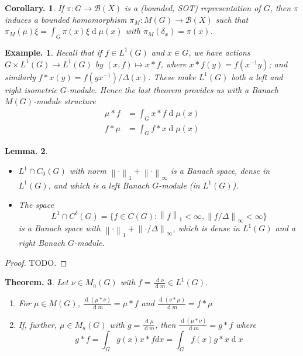 \documentclass[11pt, a4paper]{memoir}
\newcommand{\norm}[1]{\ensuremath{\left\lVert#1\right\rVert}}
\theoremstyle{change}
\newtheorem{theorem}{Theorem.}[section]
\newtheorem{lemma}[theorem]{Lemma.}
\newtheorem{corollary}[theorem]{Corollary.}
\theoremstyle{plain}
\theoremstyle{nonumberplain}
\newtheorem{example}{Example.}
\newtheorem{proof}{Proof}
\renewcommand{\d}[1]{\ensuremath{\operatorname{d}\!{#1}}}
\numberwithin{equation}{section}
\begin{document}
\begin{corollary}
    If $\pi:G\to\mathcal{B}(X)$ is a (bounded, SOT) representation of $G$, then $\pi$ induces a bounded homomorphism $\pi_M:M(G)\to\mathcal{B}(X)$ such that $\pi_M(\mu)\xi=\int_G\pi(x)\xi\d{\mu(x)}$ with $\pi_M(\delta_x)=\pi(x)$.
\end{corollary}
\begin{example}
    Recall that if $f\in L^1(G)$ and $x\in G$, we have actions $G\times L^1(G)\to L^1(G)$ by $(x,f)\mapsto x*f$, where $x*f(y)=f(x^{-1}y)$; and similarly $f*x(y)=f(yx^{-1})/\Delta(x)$.
    These make $L^1(G)$ both a left and right isometric $G$-module.
    Hence the last theorem provides us with a Banach $M(G)$-module structure
    \begin{align*}
        \mu*f&=\int_Gx*f\d{\mu(x)}\\
        f*\mu&=\int_Gf*x\d{\mu(x)}
    \end{align*}
\end{example}
\begin{lemma}
    \begin{itemize}[nl]
        \item $L^1\cap C_0(G)$ with norm $\norm{\cdot}_1+\norm{\cdot}_\infty$ is a Banach space, dense in $L^1(G)$, and which is a left Banach $G$-module (in $L^1(G)$).
        \item The space
            \begin{equation*}
                L^1\cap C^\delta(G)=\{f\in C(G):\norm{f}_1<\infty,\norm{f/\Delta}_\infty<\infty\}
            \end{equation*}
            is a Banach space with $\norm{\cdot}_1+\norm{\cdot/\Delta}_\infty$, which is dense in $L^1(G)$ and a right Banach $G$-module.
    \end{itemize}
\end{lemma}
\begin{proof}
    TODO.
\end{proof}
\begin{theorem}
    Let $\nu\in M_a(G)$ with $f=\frac{\d{\nu}}{\d{m}}\in L^1(G)$.
    \begin{enumerate}[nl,r]
        \item For $\mu\in M(G)$, $\frac{\d{(\mu*\nu)}}{\d{m}}=\mu*f$ and $\frac{\d{(\nu*\mu)}}{\d{m}}=f*\mu$
        \item If, further, $\mu\in M_a(G)$ with $g=\frac{\d{\mu}}{\d{m}}$, then $\frac{\d{(\mu*\nu)}}{\d{m}}=g*f$ where
            \begin{equation*}
                g*f=\int_Gg(x)x*fd{x}=\int_Gf(x)g*x\d{x}
            \end{equation*}
    \end{enumerate}
\end{theorem}
\end{document}
